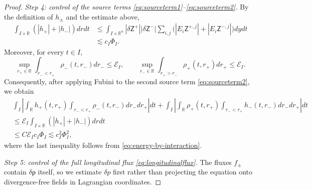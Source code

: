 \documentclass[11pt,reqno]{amsart}
\theoremstyle{plain}
\theoremstyle{definition}
\theoremstyle{remark}
\numberwithin{equation}{section}
\newcommand{\Real}{\mathbb R}
\newcommand{\Rn}{\Real^n}
\begin{document}
\begin{proof}
\emph{Step 4: control of the source terms
\eqref{eq:sourceterm1}--\eqref{eq:sourceterm2}.}
By the definition of $h_\pm$ and the estimate above,
\[
\begin{aligned}
 \int_{I\times\Real}(|h_+|+|h_-|) dr dt
 &\le
 \int_{I\times\Rn}
 |\delta\mathsf Z^+||\delta\mathsf Z^-|
 \sum_{i,j}\bigl(
 |E_i\mathsf Z^{+,j}|+|E_i\mathsf Z^{-,j}|
 \bigr) dy dt\\
 &\lesssim c_I\Phi_I.
\end{aligned}
\]
Moreover, for every $t\in I$,
\[
 \sup_{r_+\in\Real}\int_{r_-<r_+}\rho_-(t,r_-) dr_-
 \le\mathcal E_I,
 \qquad
 \sup_{r_-\in\Real}\int_{r_+>r_-}\rho_+(t,r_+) dr_+
 \le\mathcal E_I.
\]
Consequently, after applying Fubini to the second source term
\eqref{eq:sourceterm2}, we obtain
\begin{equation}\label{eq:sourcetermbound}
\begin{split}
    &\int_I
 \left|
 \int_{\Real}h_+(t,r_+)
     \int_{r_-<r_+}\rho_-(t,r_-) dr_- dr_+
 \right| dt+
 \int_I
 \left|
 \int_{\Real}\rho_+(t,r_+)
     \int_{r_-<r_+}h_-(t,r_-) dr_- dr_+
 \right| dt\\
 &\le
 \mathcal E_I
 \int_{I\times\Real}(|h_+|+|h_-|) dr dt\\
 &\le C\mathcal E_Ic_I\Phi_I
 \lesssim c_I^2\Phi_I^2,
 \end{split}
\end{equation}
where the last inequality follows from
\eqref{eq:energy-by-interaction}.

\emph{Step 5: control of the full longitudinal flux
\eqref{eq:longitudinalflux}.}
The fluxes $f_\pm$ contain $\delta\mathsf p$ itself, so we
estimate $\delta p$ first rather than projecting the equation onto
divergence-free fields in Lagrangian coordinates.


\end{proof}
\end{document}

